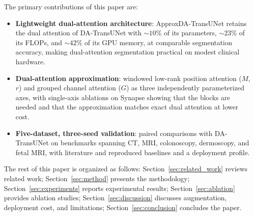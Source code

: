 The primary contributions of this paper are:
\begin{itemize}
    \item \textbf{Lightweight dual-attention architecture}: ApproxDA-TransUNet retains the dual attention of DA-TransUNet with ${\sim}10\%$ of its parameters, ${\sim}23\%$ of its FLOPs, and ${\sim}42\%$ of its GPU memory, at comparable segmentation accuracy, making dual-attention segmentation practical on modest clinical hardware.
    \item \textbf{Dual-attention approximation}: windowed low-rank position attention ($M$, $r$) and grouped channel attention ($G$) as three independently parameterized axes, with single-axis ablations on Synapse showing that the blocks are needed and that the approximation matches exact dual attention at lower cost.
    \item \textbf{Five-dataset, three-seed validation}: paired comparisons with DA-TransUNet on benchmarks spanning CT, MRI, colonoscopy, dermoscopy, and fetal MRI, with literature and reproduced baselines and a deployment profile.
\end{itemize}

The rest of this paper is organized as follows: Section~\ref{sec:related_work} reviews related work; Section~\ref{sec:method} presents the methodology; Section~\ref{sec:experiments} reports experimental results; Section~\ref{sec:ablation} provides ablation studies; Section~\ref{sec:discussion} discusses augmentation, deployment cost, and limitations; Section~\ref{sec:conclusion} concludes the paper.
